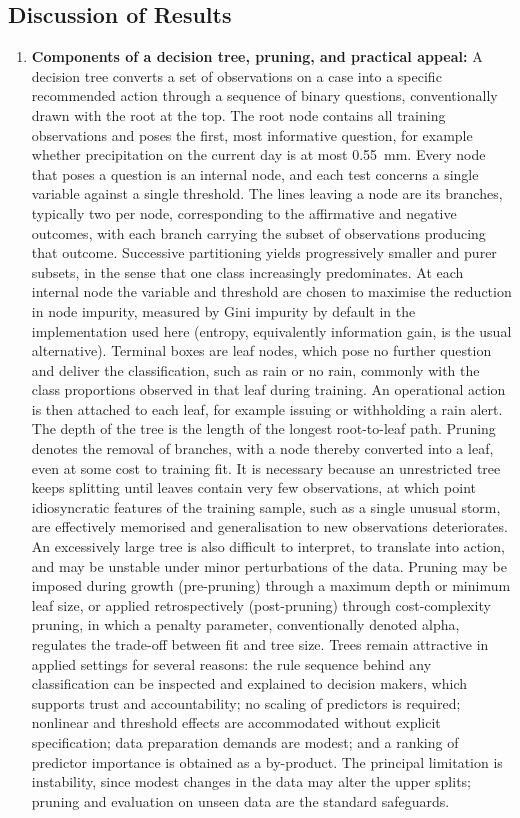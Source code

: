 \documentclass[conference]{IEEEtran}
\begin{document}
\subsection{Discussion of Results}
\begin{enumerate}
    \item \textbf{Components of a decision tree, pruning, and practical appeal:} A decision tree converts a set of observations on a case into a specific recommended action through a sequence of binary questions, conventionally drawn with the root at the top. The root node contains all training observations and poses the first, most informative question, for example whether precipitation on the current day is at most 0.55~mm. Every node that poses a question is an internal node, and each test concerns a single variable against a single threshold. The lines leaving a node are its branches, typically two per node, corresponding to the affirmative and negative outcomes, with each branch carrying the subset of observations producing that outcome. Successive partitioning yields progressively smaller and purer subsets, in the sense that one class increasingly predominates. At each internal node the variable and threshold are chosen to maximise the reduction in node impurity, measured by Gini impurity by default in the implementation used here (entropy, equivalently information gain, is the usual alternative). Terminal boxes are leaf nodes, which pose no further question and deliver the classification, such as rain or no rain, commonly with the class proportions observed in that leaf during training. An operational action is then attached to each leaf, for example issuing or withholding a rain alert. The depth of the tree is the length of the longest root-to-leaf path. Pruning denotes the removal of branches, with a node thereby converted into a leaf, even at some cost to training fit. It is necessary because an unrestricted tree keeps splitting until leaves contain very few observations, at which point idiosyncratic features of the training sample, such as a single unusual storm, are effectively memorised and generalisation to new observations deteriorates. An excessively large tree is also difficult to interpret, to translate into action, and may be unstable under minor perturbations of the data. Pruning may be imposed during growth (pre-pruning) through a maximum depth or minimum leaf size, or applied retrospectively (post-pruning) through cost-complexity pruning, in which a penalty parameter, conventionally denoted alpha, regulates the trade-off between fit and tree size. Trees remain attractive in applied settings for several reasons: the rule sequence behind any classification can be inspected and explained to decision makers, which supports trust and accountability; no scaling of predictors is required; nonlinear and threshold effects are accommodated without explicit specification; data preparation demands are modest; and a ranking of predictor importance is obtained as a by-product. The principal limitation is instability, since modest changes in the data may alter the upper splits; pruning and evaluation on unseen data are the standard safeguards.


\end{enumerate}
\end{document}
